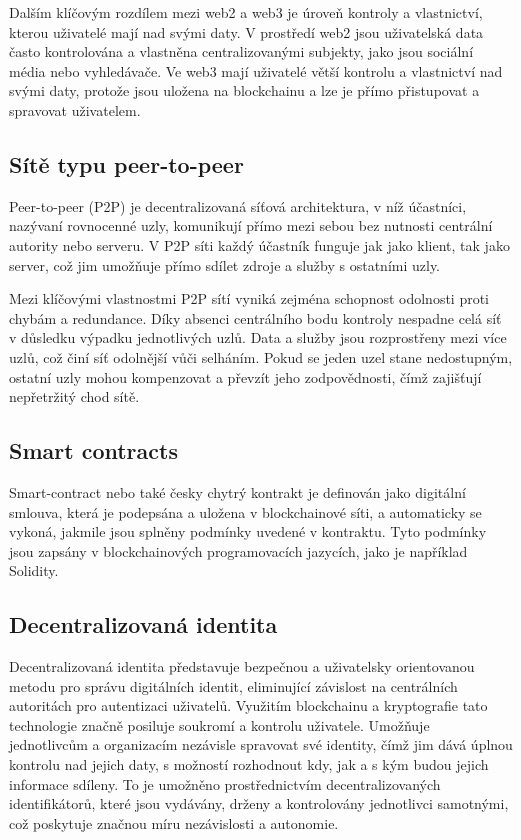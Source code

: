 Dalším klíčovým rozdílem mezi web2 a web3 je úroveň kontroly a vlastnictví, kterou uživatelé mají nad svými daty. V prostředí web2 jsou uživatelská data často kontrolována a vlastněna centralizovanými subjekty, jako jsou sociální média nebo vyhledávače. Ve web3 mají uživatelé větší kontrolu a vlastnictví nad svými daty, protože jsou uložena na blockchainu a lze je přímo přistupovat a spravovat uživatelem. \cite{Web2VsWeb3}


\subsection{Sítě typu peer-to-peer}\label{subsec:P2P}

Peer-to-peer (P2P) je decentralizovaná síťová architektura, v níž účastníci, nazývaní rovnocenné uzly, komunikují přímo mezi sebou bez nutnosti centrální autority nebo serveru. V P2P síti každý účastník funguje jak jako klient, tak jako server, což jim umožňuje přímo sdílet zdroje a služby s ostatními uzly.


Mezi klíčovými vlastnostmi P2P sítí vyniká zejména schopnost odolnosti proti chybám a redundance. Díky absenci centrálního bodu kontroly nespadne celá síť v důsledku výpadku jednotlivých uzlů. Data a služby jsou rozprostřeny mezi více uzlů, což činí síť odolnější vůči selháním. Pokud se jeden uzel stane nedostupným, ostatní uzly mohou kompenzovat a převzít jeho zodpovědnosti, čímž zajišťují nepřetržitý chod sítě.	\cite{P2P site}



\subsection{Smart contracts}\label{subsec:SmartContract}

Smart-contract nebo také česky chytrý kontrakt je definován jako digitální smlouva, která je podepsána a uložena v blockchainové síti, a automaticky se vykoná, jakmile jsou splněny podmínky uvedené v kontraktu. Tyto podmínky jsou zapsány v blockchainových programovacích jazycích, jako je například Solidity.	\cite{Smart-contract}


\subsection{Decentralizovaná identita}\label{subsec:DecentralizedIdentity}

Decentralizovaná identita představuje bezpečnou a uživatelsky orientovanou metodu pro správu digitálních identit, eliminující závislost na centrálních autoritách pro autentizaci uživatelů. Využitím blockchainu a kryptografie tato technologie značně posiluje soukromí a kontrolu uživatele. Umožňuje jednotlivcům a organizacím nezávisle spravovat své identity, čímž jim dává úplnou kontrolu nad jejich daty, s možností rozhodnout kdy, jak a s kým budou jejich informace sdíleny. To je umožněno prostřednictvím decentralizovaných identifikátorů, které jsou vydávány, drženy a kontrolovány jednotlivci samotnými, což poskytuje značnou míru nezávislosti a autonomie.

